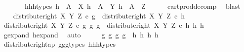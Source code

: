 \begin{isabellebody}
\ \ \ \ \ \ \ h{}{\isacharunderscore}{\kern0pt}h{}{\isacharunderscore}{\kern0pt}h{}{\isacharunderscore}{\kern0pt}types{\isacharcolon}{\kern0pt}\ {\isachardoublequoteopen}h{}\ {\isacharcolon}{\kern0pt}\ A\ {\isasymrightarrow}\ X{\isachardoublequoteclose}\ {\isachardoublequoteopen}h{}\ {\isacharcolon}{\kern0pt}\ A\ {\isasymrightarrow}\ Y{\isachardoublequoteclose}\ {\isachardoublequoteopen}h{}\ {\isacharcolon}{\kern0pt}\ A\ {\isasymrightarrow}\ Z{\isachardoublequoteclose}\isanewline
\ \ \ \ \isamarkupfalse%
\ cart{\isacharunderscore}{\kern0pt}prod{\isacharunderscore}{\kern0pt}decomp\ \isamarkupfalse%
\ blast\ \isanewline
\isanewline
\ \ \isamarkupfalse%
\ {\isachardoublequoteopen}distribute{\isacharunderscore}{\kern0pt}right\ X\ Y\ Z\ {\isasymcirc}\isactrlsub c\ g\ {\isacharequal}{\kern0pt}\ distribute{\isacharunderscore}{\kern0pt}right\ X\ Y\ Z\ {\isasymcirc}\isactrlsub c\ h{\isachardoublequoteclose}\isanewline
\ \ \isamarkupfalse%
\ \isamarkupfalse%
\ {\isachardoublequoteopen}distribute{\isacharunderscore}{\kern0pt}right\ X\ Y\ Z\ {\isasymcirc}\isactrlsub c\ {\isasymlangle}{\isasymlangle}g{}{\isacharcomma}{\kern0pt}\ g{}{\isasymrangle}{\isacharcomma}{\kern0pt}\ g{}{\isasymrangle}\ {\isacharequal}{\kern0pt}\ distribute{\isacharunderscore}{\kern0pt}right\ X\ Y\ Z\ {\isasymcirc}\isactrlsub c\ {\isasymlangle}{\isasymlangle}h{}{\isacharcomma}{\kern0pt}\ h{}{\isasymrangle}{\isacharcomma}{\kern0pt}\ h{}{\isasymrangle}{\isachardoublequoteclose}\isanewline
\ \ \ \ \isamarkupfalse%
\ g{\isacharunderscore}{\kern0pt}expand\ h{\isacharunderscore}{\kern0pt}expand\ \isamarkupfalse%
\ auto\isanewline
\ \ \isamarkupfalse%
\ \isamarkupfalse%
\ {\isachardoublequoteopen}{\isasymlangle}{\isasymlangle}g{}{\isacharcomma}{\kern0pt}\ g{}{\isasymrangle}{\isacharcomma}{\kern0pt}\ {\isasymlangle}g{}{\isacharcomma}{\kern0pt}\ g{}{\isasymrangle}{\isasymrangle}\ {\isacharequal}{\kern0pt}\ {\isasymlangle}{\isasymlangle}h{}{\isacharcomma}{\kern0pt}\ h{}{\isasymrangle}{\isacharcomma}{\kern0pt}\ {\isasymlangle}h{}{\isacharcomma}{\kern0pt}\ h{}{\isasymrangle}{\isasymrangle}{\isachardoublequoteclose}\isanewline
\ \ \ \ \isamarkupfalse%
\ distribute{\isacharunderscore}{\kern0pt}right{\isacharunderscore}{\kern0pt}ap\ g{}{\isacharunderscore}{\kern0pt}g{}{\isacharunderscore}{\kern0pt}g{}{\isacharunderscore}{\kern0pt}types\ h{}{\isacharunderscore}{\kern0pt}h{}{\isacharunderscore}{\kern0pt}h{}{\isacharunderscore}{\kern0pt}types\ \isamarkupfalse%

\end{isabellebody}
